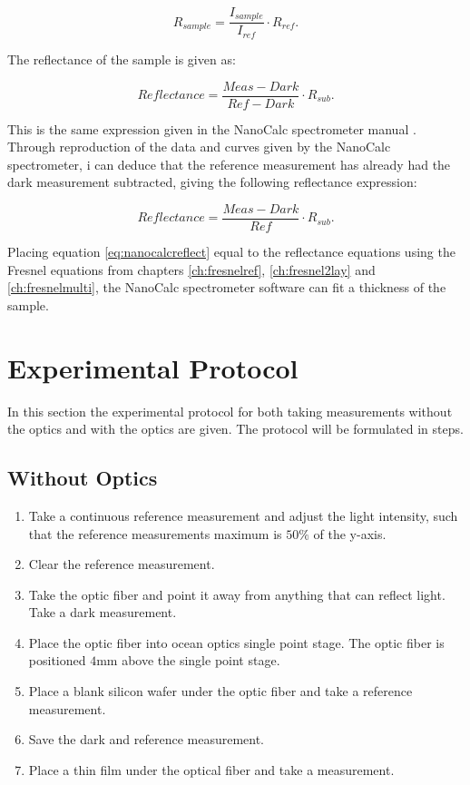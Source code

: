\documentclass[MasterThesisMain.tex]{subfiles}
\begin{document}
\begin{equation}
R_{sample} = \frac{I_{sample}}{I_{ref}} \cdot R_{ref}.
\end{equation}

The reflectance of the sample is given as:

\begin{equation}
Reflectance = \frac{Meas-Dark}{Ref-Dark} \cdot R_{sub}.
\end{equation}

This is the same expression given in the NanoCalc spectrometer manual \cite{nanocalcmanual}. Through reproduction of the data and curves given by the NanoCalc spectrometer, i can deduce that the reference measurement has already had the dark measurement subtracted, giving the following reflectance expression:

\begin{equation}\label{eq:nanocalcreflect}
Reflectance = \frac{Meas-Dark}{Ref} \cdot R_{sub}.
\end{equation}

Placing equation \ref{eq:nanocalcreflect} equal to the reflectance equations using the Fresnel equations from chapters  \ref{ch:fresnelref}, \ref{ch:fresnel2lay} and \ref{ch:fresnelmulti}, the NanoCalc spectrometer software can fit a thickness of the sample.


\section{Experimental Protocol}
In this section the experimental protocol for both taking measurements without the optics and with the optics are given. The protocol will be formulated in steps.

\subsection{Without Optics}
\begin{enumerate}
\item Take a continuous reference measurement and adjust the light intensity, such that the reference measurements maximum is $50\%$ of the y-axis.
\item Clear the reference measurement.
\item Take the optic fiber and point it away from anything that can reflect light. Take a dark measurement.
\item Place the optic fiber into ocean optics single point stage. The optic fiber is positioned $4$mm above the single point stage.
\item Place a blank silicon wafer under the optic fiber and take a reference measurement.
\item Save the dark and reference measurement.
\item Place a thin film under the optical fiber and take a measurement.  
\end{enumerate}
\end{document}
